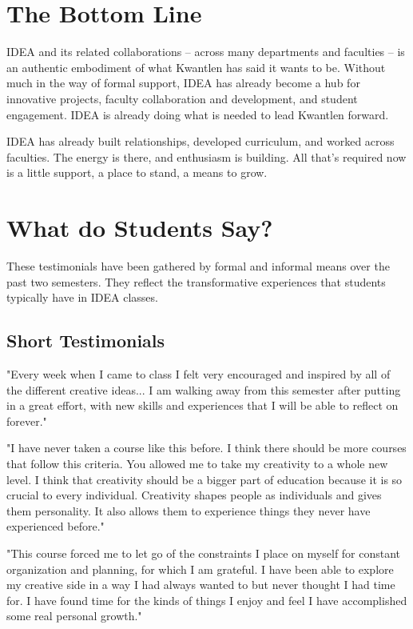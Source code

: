 \documentclass[letterpaper,10pt,headsepline]{scrreprt}
\begin{document}
\section{The Bottom Line}

IDEA and its related collaborations -- across many departments and faculties -- is an authentic embodiment of what Kwantlen has said it wants to be. Without much in the way of formal support, IDEA has already become a hub for innovative projects, faculty collaboration and development, and student engagement. IDEA is already doing what is needed to lead Kwantlen forward.

IDEA has already built relationships, developed curriculum, and worked across faculties. The energy is there, and enthusiasm is building. All that's required now is a little support, a place to stand, a means to grow.

\section{What do Students Say?}

These testimonials have been gathered by formal and informal means over the past two semesters. They reflect the transformative experiences that students typically have in IDEA classes.

\subsection{Short Testimonials}

"Every week when I came to class I felt very encouraged and inspired by all of the different creative ideas... I am walking away from this semester after putting in a great effort, with new skills and experiences that I will be able to reflect on forever."
\vspace{2em}

"I have never taken a course like this before. I think there should be more courses that follow this criteria. You allowed me to take my creativity to a whole new level. I think that creativity should be a bigger part of education because it is so crucial to every individual. Creativity shapes people as individuals and gives them personality. It also allows them to experience things they never have experienced before."
\vspace{2em}

"This course forced me to let go of the constraints I place on myself for constant organization and planning, for which I am grateful. I have been able to explore my creative side in a way I had always wanted to but never thought I had time for. I have found time for the kinds of things I enjoy and feel I have accomplished some real personal growth."
\vspace{2em}
\end{document}
